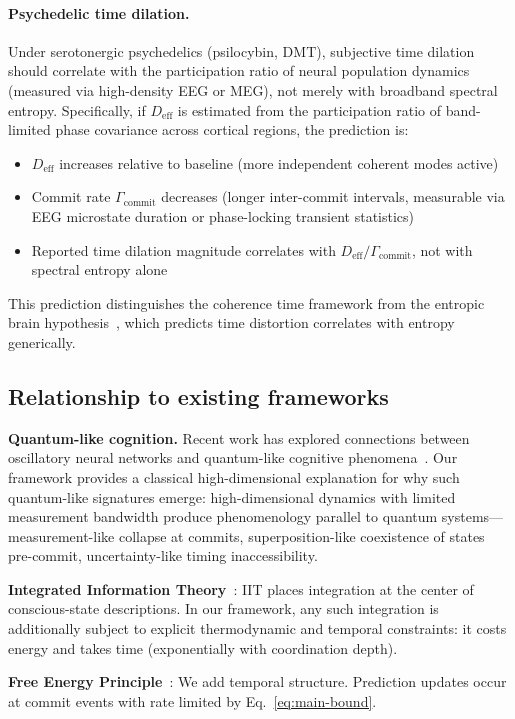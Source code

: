 \documentclass[12pt]{article}
\newcommand{\Deff}{D_{\mathrm{eff}}}
\begin{document}
\paragraph{Psychedelic time dilation.}
Under serotonergic psychedelics (psilocybin, DMT), subjective time dilation should
correlate with the participation ratio of neural population dynamics (measured via
high-density EEG or MEG), not merely with broadband spectral entropy. Specifically,
if $\Deff$ is estimated from the participation ratio of band-limited phase covariance
across cortical regions, the prediction is:
\begin{itemize}
\item $\Deff$ increases relative to baseline (more independent coherent modes active)
\item Commit rate $\Gamma_{\mathrm{commit}}$ decreases (longer inter-commit intervals,
measurable via EEG microstate duration or phase-locking transient statistics)
\item Reported time dilation magnitude correlates with $\Deff / \Gamma_{\mathrm{commit}}$,
not with spectral entropy alone
\end{itemize}
This prediction distinguishes the coherence time framework from the entropic brain
hypothesis~\cite{carhart2014}, which predicts time distortion correlates with entropy
generically.

\subsection{Relationship to existing frameworks}

\textbf{Quantum-like cognition.} Recent work has explored connections between oscillatory neural networks and quantum-like cognitive phenomena~\cite{khrennikov2025bridge}. Our framework provides a classical high-dimensional explanation for why such quantum-like signatures emerge: high-dimensional dynamics with limited measurement bandwidth produce phenomenology parallel to quantum systems---measurement-like collapse at commits, superposition-like coexistence of states pre-commit, uncertainty-like timing inaccessibility.

\textbf{Integrated Information Theory}~\cite{tononi2016}: IIT places integration at the center of conscious-state descriptions. In our framework, any such integration is additionally subject to explicit thermodynamic and temporal constraints: it costs energy and takes time (exponentially with coordination depth).

\textbf{Free Energy Principle}~\cite{friston2010}: We add temporal structure. Prediction updates occur at commit events with rate limited by Eq.~\ref{eq:main-bound}.
\end{document}
